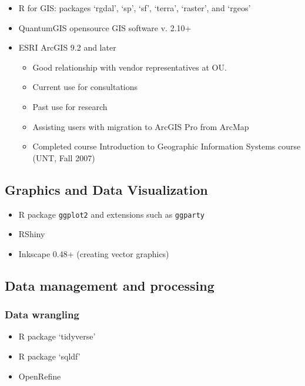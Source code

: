 \documentclass[
  letterpaper,
  DIV=11,
  numbers=noendperiod,
  oneside]{scrreprt}
\providecommand{\tightlist}{%
  \setlength{\itemsep}{0pt}\setlength{\parskip}{0pt}}\usepackage{longtable,booktabs,array}
\begin{document}
\begin{itemize}
\tightlist
\item
  R for GIS: packages `rgdal', `sp', `sf', `terra', `raster', and
  `rgeos'
\item
  QuantumGIS opensource GIS software v. 2.10+
\item
  ESRI ArcGIS 9.2 and later

  \begin{itemize}
  \tightlist
  \item
    Good relationship with vendor representatives at OU.
  \item
    Current use for consultations
  \item
    Past use for research
  \item
    Assisting users with migration to ArcGIS Pro from ArcMap
  \item
    Completed course Introduction to Geographic Information Systems
    course (UNT, Fall 2007)
  \end{itemize}
\end{itemize}

\subsection{Graphics and Data
Visualization}\label{graphics-and-data-visualization}

\begin{itemize}
\tightlist
\item
  R package \texttt{ggplot2} and extensions such as \texttt{ggparty}
\item
  RShiny
\item
  Inkscape 0.48+ (creating vector graphics)
\end{itemize}

\subsection{Data management and
processing}\label{data-management-and-processing}

\subsubsection{Data wrangling}\label{data-wrangling}

\begin{itemize}
\tightlist
\item
  R package `tidyverse'
\item
  R package `sqldf'
\item
  OpenRefine
\end{itemize}
\end{document}
